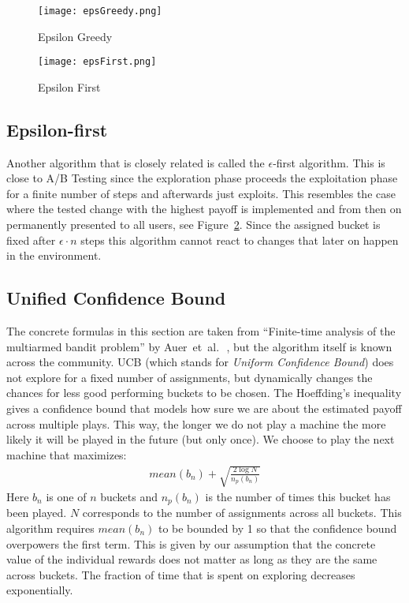 \documentclass[main.tex]{subfiles}
\begin{document}
\begin{figure}[ht]
\texttt{[image: epsGreedy.png]}
\centering
\caption{Epsilon Greedy}
\label{fig:EpsGreedy}
\end{figure}
\begin{figure}[ht]
\texttt{[image: epsFirst.png]}
\centering
\caption{Epsilon First}
\label{fig:epsFir}
\end{figure}
\clearpage

\subsection{Epsilon-first}
Another algorithm that is closely related is called the $\epsilon$-first algorithm. This is close to A/B Testing since the exploration phase proceeds the exploitation phase for a finite number of steps and afterwards just exploits. This resembles the case where the tested change with the highest payoff is implemented and from then on permanently presented to all users, see Figure~\ref{fig:epsFir}. Since the assigned bucket is fixed after $\epsilon \cdot n$ steps this algorithm cannot react to changes that later on happen in the environment.

\subsection{Unified Confidence Bound}\label{ssc:ucb}
The concrete formulas in this section are taken from ``Finite-time analysis of the multiarmed bandit problem'' by Auer~et~al.\,~\cite{auer2002finite}, but the algorithm itself is known across the community. UCB (which stands for \emph{Uniform Confidence Bound}) does not explore for a fixed number of assignments, but dynamically changes the chances for less good performing buckets to be chosen. The Hoeffding's inequality gives a confidence bound that models how sure we are about the estimated payoff across multiple plays. This way, the longer we do not play a machine the more likely it will be played in the future (but only once). We choose to play the next machine that maximizes:
\begin{align*}
mean(b_n) + \sqrt{\frac{2\log{N}}{n_p(b_n)}}
\end{align*}
Here $b_n$ is one of $n$ buckets and $n_p(b_n)$ is the number of times this bucket has been played. $N$ corresponds to the number of assignments across all buckets. This algorithm requires $mean(b_n)$ to be bounded by 1 so that the confidence bound overpowers the first term. This is given by our assumption that the concrete value of the individual rewards does not matter as long as they are the same across buckets. The fraction of time that is spent on exploring decreases exponentially.
\end{document}
